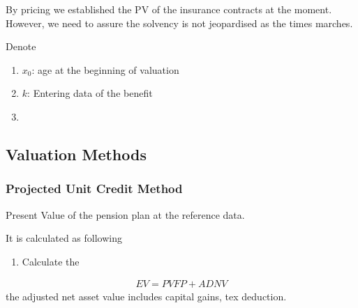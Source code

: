 By pricing we established the PV of the insurance contracts at the moment. However, we need to assure the solvency is not jeopardised as the times marches. 



\begin{lemma}
	Denote 
	\begin{enumerate}
		\item $x_0$: age at the beginning of valuation
		\item $k$: Entering data of the benefit
		\item 
	\end{enumerate}
\end{lemma}

\subsection{Valuation Methods}
\subsubsection{Projected Unit Credit Method}
\begin{definition}
Present Value of the pension plan at the reference data.
\end{definition}


\begin{proposition}
	It is calculated as following 
	\begin{enumerate}
		\item Calculate the 
	\end{enumerate}
\end{proposition}



\begin{definition}
\end{definition}


\begin{definition}
\begin{align*}
	EV = PVFP + ADNV
\end{align*}
the adjusted net asset value includes capital gains, tex deduction. 
\end{definition}









